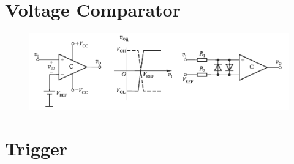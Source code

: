 \section{Voltage Comparator}

\begin{figure}[H]
  \centering
  \includegraphics[width=\linewidth]{figures/Voltage-Comparator}
\end{figure}

\section{Trigger}

